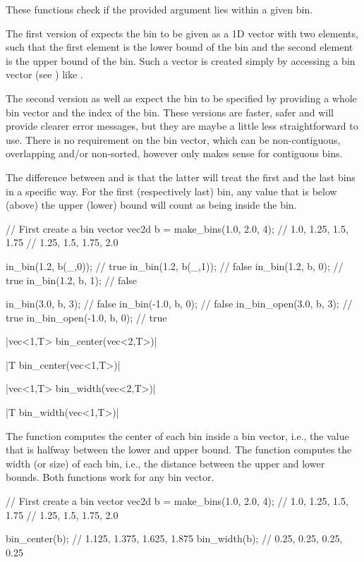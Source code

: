 These functions check if the provided argument lies within a given bin.

The first version of  expects the bin to be given as a 1D vector with two elements, such that the first element is the lower bound of the bin and the second element is the upper bound of the bin. Such a vector is created simply by accessing a bin vector (see ) like .

The second version as well as  expect the bin to be specified by providing a whole bin vector and the index of the bin. These versions are faster, safer and will provide clearer error messages, but they are maybe a little less straightforward to use. There is no requirement on the bin vector, which can be non-contiguous, overlapping and/or non-sorted, however  only makes sense for contiguous bins.

The difference between  and  is that the latter will treat the first and the last bins in a specific way. For the first (respectively last) bin, any value that is below (above) the upper (lower) bound will count as being inside the bin.

\begin{example}
\begin{cppcode}
// First create a bin vector
vec2d b = make_bins(1.0, 2.0, 4);
// {1.0,  1.25, 1.5,  1.75}
// {1.25, 1.5,  1.75, 2.0}

in_bin(1.2, b(_,0)); // true
in_bin(1.2, b(_,1)); // false
in_bin(1.2, b, 0);   // true
in_bin(1.2, b, 1);   // false

in_bin(3.0,  b, 3);      // false
in_bin(-1.0, b, 0);      // false
in_bin_open(3.0,  b, 3); // true
in_bin_open(-1.0, b, 0); // true
\end{cppcode}
\end{example}

\funcitem \cppinline|vec<1,T> bin_center(vec<2,T>)| 

\cppinline|T bin_center(vec<1,T>)|

\cppinline|vec<1,T> bin_width(vec<2,T>)| 

\cppinline|T bin_width(vec<1,T>)|

The function  computes the center of each bin inside a bin vector, i.e., the value that is halfway between the lower and upper bound. The function  computes the width (or size) of each bin, i.e., the distance between the upper and lower bounds. Both functions work for any bin vector.

\begin{example}
\begin{cppcode}
// First create a bin vector
vec2d b = make_bins(1.0, 2.0, 4);
// {1.0,  1.25, 1.5,  1.75}
// {1.25, 1.5,  1.75, 2.0}

bin_center(b); // {1.125, 1.375, 1.625, 1.875}
bin_width(b); // {0.25, 0.25, 0.25, 0.25}
\end{cppcode}
\end{example}

